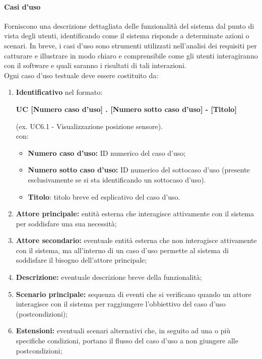 \paragraph{Casi d'uso}
Forniscono una descrizione dettagliata delle funzionalità del sistema dal punto di vista degli utenti, identificando come il sistema risponde a determinate azioni o scenari. In breve, i casi d'uso sono strumenti utilizzati nell'analisi dei requisiti per catturare e illustrare in modo chiaro e comprensibile come gli utenti interagiranno con il software e quali saranno i risultati di tali interazioni. \\
Ogni caso d'uso testuale deve essere costituito da:
\begin{enumerate}
    \item \textbf{Identificativo} nel formato:\\
          \begin{center}
              \textbf{UC [Numero caso d'uso] . [Numero sotto caso d'uso] - [Titolo]}
          \end{center}
          (ex. UC6.1 - Visualizzazione posizione sensore).\\
          con:
          \begin{itemize}
              \item \textbf{Numero caso d'uso:} ID numerico del caso d'uso;
              \item \textbf{Numero sotto caso d'uso:} ID numerico del sottocaso d'uso (presente esclusivamente se si sta identificando un sottocaso d'uso).
              \item \textbf{Titolo}: titolo breve ed esplicativo del caso d'uso.
          \end{itemize}
    \item \textbf{Attore principale:} entità esterna che interagisce attivamente con il sistema per soddisfare una sua necessità;
    \item \textbf{Attore secondario:} eventuale entità esterna che non interagisce attivamente con il sistema, ma all'interno di un caso d'uso permette al sistema di soddisfare il bisogno dell'attore principale;
    \item \textbf{Descrizione:} eventuale descrizione breve della funzionalità;
    \item \textbf{Scenario principale:} sequenza di eventi che si verificano quando un attore interagisce con il sistema per raggiungere l'obbiettivo del caso d'uso (postcondizioni);
    \item \textbf{Estensioni:} eventuali scenari alternativi che, in seguito ad una o più specifiche condizioni, portano il flusso del caso d'uso a non giungere alle postcondizioni;

\end{enumerate}
